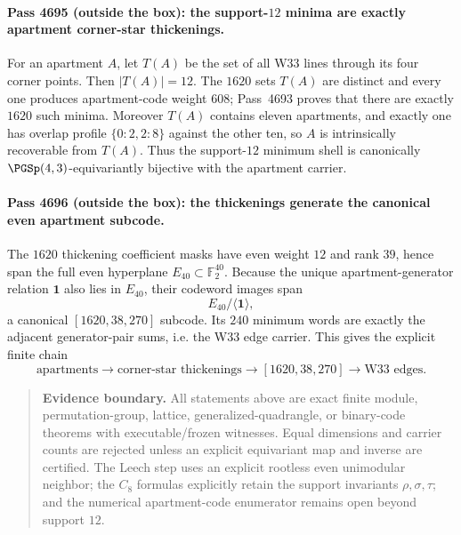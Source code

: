 \paragraph{Pass 4695 (outside the box): the support-$12$ minima are exactly apartment corner-star thickenings.}
For an apartment $A$, let $T(A)$ be the set of all W33 lines through its four corner points.  Then $|T(A)|=12$.  The $1620$ sets $T(A)$ are distinct and every one produces apartment-code weight $608$; Pass~4693 proves that there are exactly $1620$ such minima.  Moreover $T(A)$ contains eleven apartments, and exactly one has overlap profile $\{0:2,2:8\}$ against the other ten, so $A$ is intrinsically recoverable from $T(A)$.  Thus the support-$12$ minimum shell is canonically $\PGSp(4,3)$-equivariantly bijective with the apartment carrier.

\paragraph{Pass 4696 (outside the box): the thickenings generate the canonical even apartment subcode.}
The $1620$ thickening coefficient masks have even weight $12$ and rank $39$, hence span the full even hyperplane $E_{40}\subset\mathbb F_2^{40}$.  Because the unique apartment-generator relation $\mathbf1$ also lies in $E_{40}$, their codeword images span
\[
 E_{40}/\langle\mathbf1\rangle,
\]
a canonical $[1620,38,270]$ subcode.  Its $240$ minimum words are exactly the adjacent generator-pair sums, i.e. the W33 edge carrier.  This gives the explicit finite chain
\[
 \text{apartments}\longrightarrow\text{corner-star thickenings}\longrightarrow
 [1620,38,270]\longrightarrow\text{W33 edges}.
\]

\begin{quote}\small
\textbf{Evidence boundary.}
All statements above are exact finite module, permutation-group, lattice, generalized-quadrangle, or binary-code theorems with executable/frozen witnesses.  Equal dimensions and carrier counts are rejected unless an explicit equivariant map and inverse are certified.  The Leech step uses an explicit rootless even unimodular neighbor; the $C_8$ formulas explicitly retain the support invariants $\rho,\sigma,\tau$; and the numerical apartment-code enumerator remains open beyond support $12$.
\end{quote}
